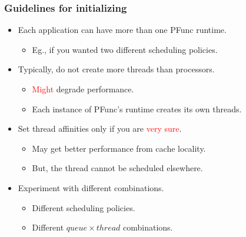 \documentclass{beamer}
\begin{document}
\begin{frame}
\frametitle{Guidelines for initializing}
\begin{itemize}
\item Each application can have more than one PFunc runtime.
  \begin{itemize}
  \item Eg., if you wanted two different scheduling policies.
  \end{itemize}
\item Typically, do not create more threads than processors.
  \begin{itemize}
  \item \textcolor{red}{Might} degrade performance.
  \item Each instance of PFunc's runtime creates its own threads.
  \end{itemize}
\item Set thread affinities only if you are \textcolor{red}{very sure}.
  \begin{itemize}
  \item May get better performance from cache locality.
  \item But, the thread cannot be scheduled elsewhere.
  \end{itemize}
\item Experiment with different combinations.
  \begin{itemize}
  \item Different scheduling policies.
  \item Different $queue\times{}thread$ combinations.
  \end{itemize}
\end{itemize}
\end{frame}
\end{document}
